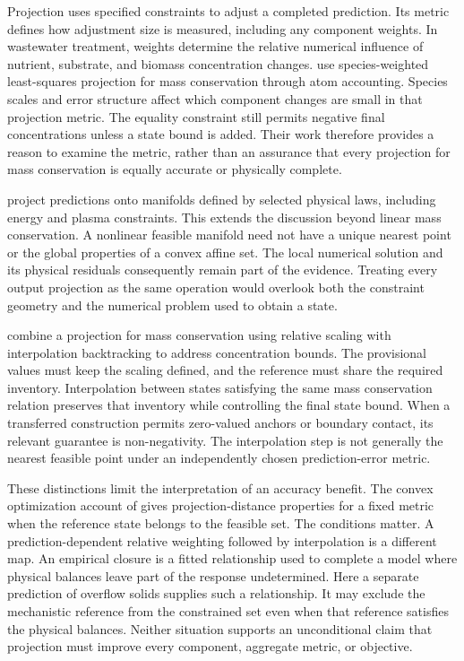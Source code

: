Projection uses specified constraints to adjust a completed prediction. Its metric defines how adjustment size is measured, including any component weights. In wastewater treatment, weights determine the relative numerical influence of nutrient, substrate, and biomass concentration changes. \citet{SturmSilva2024} use species-weighted least-squares projection for mass conservation through atom accounting. Species scales and error structure affect which component changes are small in that projection metric. The equality constraint still permits negative final concentrations unless a state bound is added. Their work therefore provides a reason to examine the metric, rather than an assurance that every projection for mass conservation is equally accurate or physically complete.

\citet{Valente2025} project predictions onto manifolds defined by selected physical laws, including energy and plasma constraints. This extends the discussion beyond linear mass conservation. A nonlinear feasible manifold need not have a unique nearest point or the global properties of a convex affine set. The local numerical solution and its physical residuals consequently remain part of the evidence. Treating every output projection as the same operation would overlook both the constraint geometry and the numerical problem used to obtain a state.

\citet{KircherVotsmeier2025} combine a projection for mass conservation using relative scaling with interpolation backtracking to address concentration bounds. The provisional values must keep the scaling defined, and the reference must share the required inventory. Interpolation between states satisfying the same mass conservation relation preserves that inventory while controlling the final state bound. When a transferred construction permits zero-valued anchors or boundary contact, its relevant guarantee is non-negativity. The interpolation step is not generally the nearest feasible point under an independently chosen prediction-error metric.

These distinctions limit the interpretation of an accuracy benefit. The convex optimization account of \citet{Boyd2004} gives projection-distance properties for a fixed metric when the reference state belongs to the feasible set. The conditions matter. A prediction-dependent relative weighting followed by interpolation is a different map. An empirical closure is a fitted relationship used to complete a model where physical balances leave part of the response undetermined. Here a separate prediction of overflow solids supplies such a relationship. It may exclude the mechanistic reference from the constrained set even when that reference satisfies the physical balances. Neither situation supports an unconditional claim that projection must improve every component, aggregate metric, or objective.

